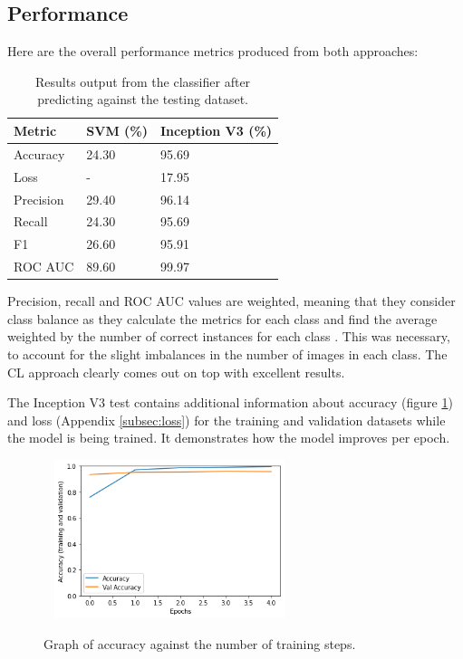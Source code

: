 \documentclass[12pt,a4paper]{report}
\begin{document}
\subsection{Performance}

Here are the overall performance metrics produced from both approaches:

\begin{table}[h!]
    \centering
    \begin{tabular}{ |l|l|l| }
        \hline
        Metric & SVM (\%) & Inception V3 (\%) \\
        \hline
        \hline
        Accuracy & 24.30 & 95.69 \\
        \hline
        Loss & - & 17.95 \\
        \hline
        Precision & 29.40 & 96.14 \\
        \hline
        Recall & 24.30 & 95.69 \\
        \hline
        F1 & 26.60 & 95.91 \\
        \hline
        ROC AUC & 89.60 & 99.97 \\
        \hline
    \end{tabular}
    \caption{Results output from the classifier after predicting against the testing dataset.}
    \label{table:2}
\end{table}

\break

Precision, recall and ROC AUC values are weighted, meaning that they consider class balance as they calculate the metrics
for each class and find the average weighted by the number of correct instances for each class 
\citep{scikitprec}. This was necessary, to account for the slight imbalances in the number of images 
in each class. The CL approach clearly comes out on top with excellent results.

\par

The Inception V3 test contains additional information about accuracy (figure \ref{fig:incep_acc}) and loss 
(Appendix \ref{subsec:loss}) for the training and validation datasets 
while the model is being trained. It demonstrates how the model improves per epoch.

\begin{figure}[h]\
    \centering
    \includegraphics[width=0.6\textwidth]{Accuracy.png}
    \caption{Graph of accuracy against the number of training steps.}
    \label{fig:incep_acc}
\end{figure}
\end{document}
